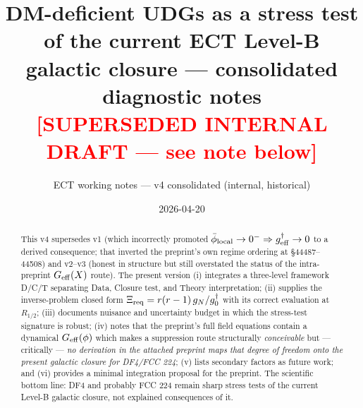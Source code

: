 \documentclass[11pt]{article}
\title{DM-deficient UDGs as a stress test of the current ECT Level-B\\
galactic closure --- consolidated diagnostic notes\\
\large\textcolor{red}{[SUPERSEDED INTERNAL DRAFT --- see note below]}}
\author{ECT working notes --- v4 consolidated (internal, historical)}
\date{2026-04-20}
\begin{document}
\maketitle

\begin{center}
\end{center}

\vspace{0.5em}

\begin{abstract}
This v4 supersedes v1 (which incorrectly promoted
$\bar\phi_{\rm local}\to 0^-\Rightarrow g^\dagger_{\rm eff}\to 0$ to
a derived consequence; that inverted the preprint's own regime
ordering at \S44487--44508) and v2--v3 (honest in structure but still
overstated the status of the intra-preprint $G_{\rm eff}(X)$ route).
The present version (i) integrates a three-level framework D/C/T
separating Data, Closure test, and Theory interpretation; (ii) supplies
the inverse-problem closed form
$\Xi_{\rm req}=r(r-1)\,g_N/g^\dagger_0$ with its correct evaluation at
$R_{1/2}$; (iii) documents nuisance and uncertainty budget in which the
stress-test signature is robust; (iv) notes that the preprint's full
field equations contain a dynamical $G_{\rm eff}(\phi)$ which makes a
suppression route structurally \emph{conceivable} but --- critically
--- \emph{no derivation in the attached preprint maps that degree of
freedom onto the present galactic closure for DF4/FCC 224}; (v) lists
secondary factors as future work; and (vi) provides a minimal
integration proposal for the preprint. The scientific bottom line:
DF4 and probably FCC 224 remain sharp stress tests of the current
Level-B galactic closure, not explained consequences of it.
\end{abstract}
\end{document}
